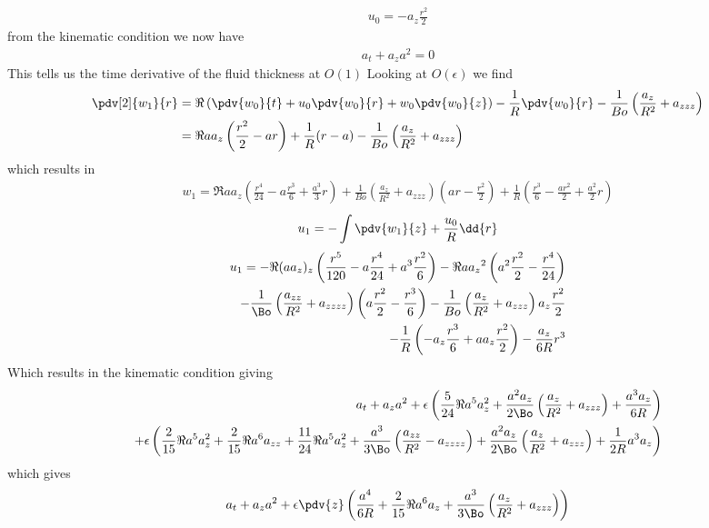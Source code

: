 \documentclass[12pt]{article}
\begin{document}
\begin{align}
u_0 = - a_z \frac{r^2}{2}
\end{align}
from the kinematic condition we now have
\begin{align}
a_t + a_za^2 = 0 
\end{align}
This tells us the time derivative of the fluid thickness at $O(1)$
Looking at $O(\epsilon)$ we find 
\begin{align}
\pdv[2]{w_1}{r}& = \Re\left(\pdv{w_0}{t}+ u_0\pdv{w_0}{r}+ w_0\pdv{w_0}{z}\right)- \frac{1}{R}\pdv{w_0}{r} -\frac{1}{Bo}\left(\frac{a_z}{R^2}+a_{zzz}\right)\\&
=\Re aa_z\left(\frac{r^2}{2}- a r\right)+\frac{1}{R}(r-a) -\frac{1}{Bo}\left(\frac{a_z}{R^2}+a_{zzz}\right)
\end{align}
which results in 
\begin{align}
w_1 = \Re a a_z\left(\frac{r^4}{24}- a\frac{r^3}{6}+\frac{a^3}{3}r\right)+ \frac{1}{Bo}\left(\frac{a_z}{R^2}+a_{zzz}\right)\left(ar - \frac{r^2}{2}\right)+\frac{1}{R}\left(\frac{r^3}{6}- \frac{ar^2}{2}+ \frac{a^2}{2}r\right)
\end{align}
\begin{align}
u_1 = -\int{\pdv{w_1}{z}+ \frac{u_0}{R}\dd{r}}
\end{align}
\begin{align}
u_1 = -\Re (aa_z)_z\left(\frac{r^5}{120}- a\frac{r^4}{24}+a^3\frac{r^2}{6}\right)- \Re a {a_z}^2\left(a^2\frac{r^2}{2}-\frac{r^4}{24}\right)\\-\frac{1}{\Bo}\left(\frac{a_{zz}}{R^2}+a_{zzzz}\right)\left(a\frac{r^2}{2}- \frac{r^3}{6}\right)-\frac{1}{Bo}\left(\frac{a_z}{R^2}+a_{zzz}\right)a_z\frac{r^2}{2}\\
-\frac{1}{R}\left(-a_z\frac{r^3}{6}+aa_z \frac{r^2}{2}\right)-\frac{a_z}{6R}r^3
\end{align}
Which results in the kinematic condition giving 
\begin{align}
a_t + a_za^2+\epsilon\left(\frac{5}{24}\Re a^5a_z^2+\frac{a^2a_z}{2\Bo}\left(\frac{a_z}{R^2}+a_{zzz}\right)+\frac{a^3a_z}{6R}\right)\\+\epsilon\left(\frac{2}{15}\Re a^5 a_z^2+\frac{2}{15}\Re a^6a_{zz}+\frac{11}{24}\Re a^5 a_z^2+\frac{a^3}{3\Bo}\left(\frac{a_{zz}}{R^2}-a_{zzzz}\right)+\frac{a^2a_z}{2\Bo}\left(\frac{a_z}{R^2}+a_{zzz}\right)+\frac{1}{2R}a^3a_z\right)
\end{align}
which gives
\begin{align}
a_t + a_z a^2  +\epsilon\pdv{z}\left(\frac{a^4}{6R}+\frac{2}{15}\Re a^6a_z+ \frac{a^3}{3\Bo}\left(\frac{a_z}{R^2}+a_{zzz}\right)\right)
\end{align}
\end{document}
